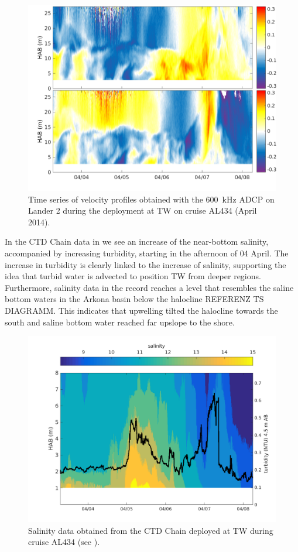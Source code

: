  \begin{figure}[ht]
\includegraphics[width=40pc]{bilder/adcp600.png}
 \caption{Time series of velocity profiles obtained with the 600~kHz ADCP on 
Lander 2 during the deployment at TW on cruise AL434 (April 2014).}
 \label{adcp600}
 \end{figure}

 In the CTD Chain data in  we see an increase of the 
near-bottom salinity, accompanied by increasing turbidity, starting in the 
afternoon of 04 April. The increase in turbidity is clearly linked to the 
increase of salinity, supporting the idea that turbid water is advected to 
position TW from deeper 
regions. Furthermore, salinity data in the record reaches a level that 
resembles the saline bottom waters in the Arkona basin below the 
halocline REFERENZ TS DIAGRAMM. This indicates that upwelling 
tilted the halocline towards the south and saline bottom water reached far 
upslope to the shore.

 \begin{figure}[ht]
\includegraphics[width=15cm]{bilder/ctdchaintw.png}
 \caption{Salinity data obtained from the CTD Chain deployed at TW 
during cruise AL434 (see ).}
 \label{ctdchain}
 \end{figure}

